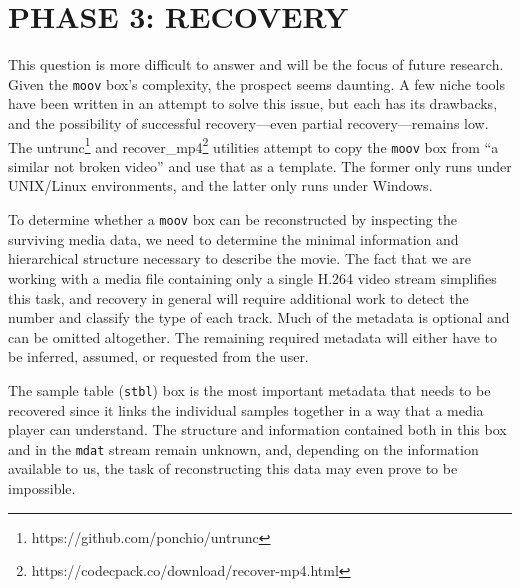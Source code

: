 
\chapter{\uppercase{Phase 3: Recovery}}

This question is more difficult to answer and will be the focus of future research. Given the \texttt{moov} box's complexity, the prospect seems daunting. A few niche tools have been written in an attempt to solve this issue, but each has its drawbacks, and the possibility of successful recovery---even partial recovery---remains low. The untrunc\footnote{https://github.com/ponchio/untrunc} and recover\_mp4\footnote{https://codecpack.co/download/recover-mp4.html} utilities attempt to copy the \texttt{moov} box from ``a similar not broken video'' and use that as a template. The former only runs under UNIX/Linux environments, and the latter only runs under Windows.

To determine whether a \texttt{moov} box can be reconstructed by inspecting the surviving media data, we need to determine the minimal information and hierarchical structure necessary to describe the movie. The fact that we are working with a media file containing only a single H.264 video stream simplifies this task, and recovery in general will require additional work to detect the number and classify the type of each track. Much of the metadata is optional and can be omitted altogether. The remaining required metadata will either have to be inferred, assumed, or requested from the user.

The sample table (\texttt{stbl}) box is the most important metadata that needs to be recovered since it links the individual samples together in a way that a media player can understand. The structure and information contained both in this box and in the \texttt{mdat} stream remain unknown, and, depending on the information available to us, the task of reconstructing this data may even prove to be impossible.
